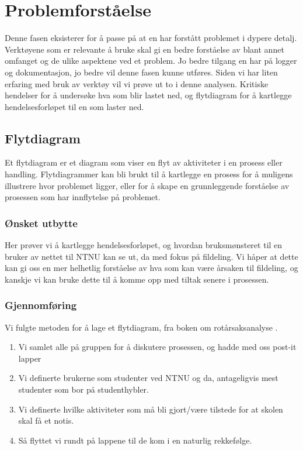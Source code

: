 \chapter{Problemforståelse}
Denne fasen eksisterer for å passe på at en har forstått problemet i dypere detalj. Verktøyene som er relevante å bruke skal gi en bedre forståelse av blant annet omfanget og de ulike aspektene ved et problem. Jo bedre tilgang en har på logger og dokumentasjon, jo bedre vil denne fasen kunne utføres. Siden vi har liten erfaring med bruk av verktøy vil vi prøve ut to i denne analysen. Kritiske hendelser for å undersøke hva som blir lastet ned, og flytdiagram for å kartlegge hendelsesforløpet til en som laster ned.

\section{Flytdiagram}
Et flytdiagram er et diagram som viser en flyt av aktiviteter i en prosess eller handling. Flytdiagrammer kan bli brukt til å kartlegge en prosess for å muligens illustrere hvor problemet ligger, eller for å skape en grunnleggende forståelse av prosessen som har innflytelse på problemet. 

\subsection{Ønsket utbytte}
Her prøver vi å kartlegge hendelsesforløpet, og hvordan bruksmønsteret til en bruker av nettet til NTNU kan se ut, da med fokus på fildeling. Vi håper at dette kan gi oss en mer helhetlig forståelse av hva som kan være årsaken til fildeling, og kanskje vi kan bruke dette til å komme opp med tiltak senere i prosessen.
\subsection{Gjennomføring}
Vi fulgte metoden for å lage et flytdiagram, fra boken om rotårsaksanalyse \cite{RCA}.
\begin{enumerate}
    \item Vi samlet alle på gruppen for å diskutere prosessen, og hadde med oss post-it lapper
    \item Vi definerte brukerne som studenter ved NTNU og da, antageligvis mest studenter som bor på studenthybler.
    \item Vi definerte hvilke aktiviteter som må bli gjort/være tilstede for at skolen skal få et notis.
    \item Så flyttet vi rundt på lappene til de kom i en naturlig rekkefølge.
\end{enumerate}


